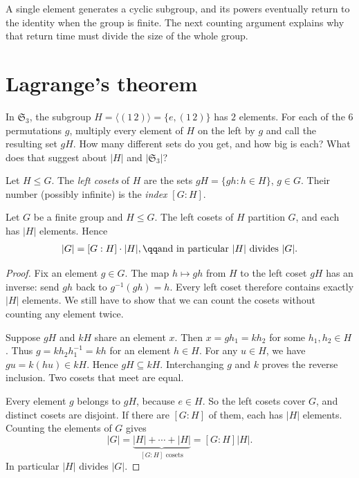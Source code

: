 A single element generates a cyclic subgroup, and its powers eventually return to the identity when the group is finite. The next counting argument explains why that return time must divide the size of the whole group.

\section{Lagrange's theorem}

\begin{think}
In $\mathfrak S_3$, the subgroup $H=\langle(1\,2)\rangle=\{e,(1\,2)\}$ has $2$ elements. For each of the $6$ permutations $g$, multiply every element of $H$ on the left by $g$ and call the resulting set $gH$. How many different sets do you get, and how big is each? What does that suggest about $|H|$ and $|\mathfrak S_3|$?
\end{think}

\begin{definition}
Let $H\le G$. The \emph{left cosets} of $H$ are the sets $gH=\{gh:h\in H\}$, $g\in G$. Their number (possibly infinite) is the \emph{index} $[G:H]$.
\end{definition}

\begin{theorem}[Lagrange]\label{thm:lagrange}
Let $G$ be a finite group and $H\le G$. The left cosets of $H$ partition $G$, and each has $|H|$ elements. Hence
\[
\begin{gathered}|G|=[G:H]\cdot|H|,\qq\text{and in particular }|H|\text{ divides }|G|.\end{gathered}
\]
\end{theorem}
\begin{proof}
Fix an element $g\in G$. The map $h\mapsto gh$ from $H$ to the left coset $gH$ has an inverse: send $gh$ back to $g^{-1}(gh)=h$. Every left coset therefore contains exactly $|H|$ elements. We still have to show that we can count the cosets without counting any element twice.

Suppose $gH$ and $kH$ share an element $x$. Then $x=gh_1=kh_2$ for some $h_1,h_2\in H$. Thus $g=kh_2h_1^{-1}=kh$ for an element $h\in H$. For any $u\in H$, we have $gu=k(hu)\in kH$. Hence $gH\subseteq kH$. Interchanging $g$ and $k$ proves the reverse inclusion. Two cosets that meet are equal.

Every element $g$ belongs to $gH$, because $e\in H$. So the left cosets cover $G$, and distinct cosets are disjoint. If there are $[G:H]$ of them, each has $|H|$ elements. Counting the elements of $G$ gives
\[
|G|=\underbrace{|H|+\cdots+|H|}_{[G:H]\text{ cosets}}
=[G:H]|H|.
\]
In particular $|H|$ divides $|G|$.
\end{proof}

